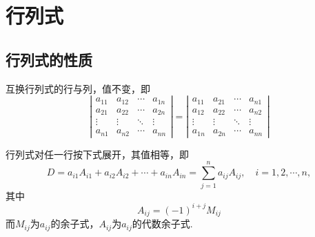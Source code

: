 \section{行列式}

\subsection{行列式的性质}

\begin{frame}
  \begin{xingzhi}
    互换行列式的行与列，值不变，即
    \begin{equation}
      \left|
        \begin{array}{cccc}
          a_{11}  &  a_{12} & \cdots & a_{1n} \\
          a_{21}  &  a_{22} & \cdots & a_{2n} \\
          \vdots & \vdots & \ddots & \vdots\\  
          a_{n1}  &  a_{n2} & \cdots & a_{nn} 
        \end{array}
      \right|
      =
      \left|
        \begin{array}{cccc}
          a_{11}  &  a_{21} & \cdots & a_{n1} \\
          a_{12}  &  a_{22} & \cdots & a_{n2} \\
          \vdots & \vdots & \ddots & \vdots\\  
          a_{1n}  &  a_{2n} & \cdots & a_{nn} 
        \end{array}
      \right|
    \end{equation}
  \end{xingzhi}
\end{frame}

\begin{frame}
  \begin{xingzhi}
    行列式对任一行按下式展开，其值相等，即
    $$
    D = a_{i1} A_{i1} + a_{i2} A_{i2} + \cdots + a_{in}A_{in} = \sum_{j=1}^n a_{ij} A_{ij}, \quad
    i = 1, 2, \cdots, n,
    $$
    其中
    $$
    A_{ij} = (-1)^{i+j} M_{ij}
    $$
    而$M_{ij}$为$a_{ij}$的余子式，$A_{ij}$为$a_{ij}$的代数余子式.
  \end{xingzhi}
\end{frame}

